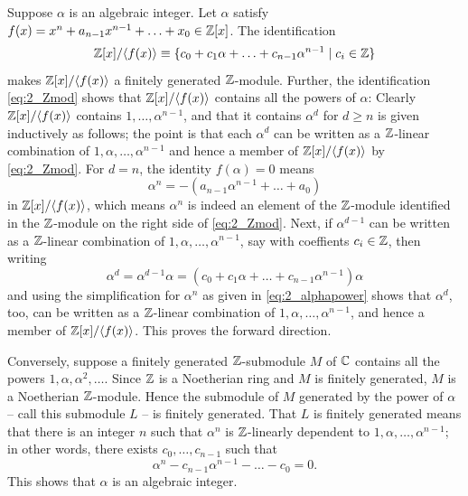 \documentclass[12pt]{article}
\begin{document}
Suppose $\alpha$ is an algebraic integer. 
Let $\alpha$ satisfy $f(x) = x^n + a_{n - 1}x^{n - 1} + \ldots + x_0 \in \mathbb{Z}[x]$. 
The identification 
\begin{equation} \label{eq:2_Zmod}
  \Z[x] / \<f(x)\> \equiv \{c_0 + c_1 \alpha + \ldots + c_{n - 1}\alpha^{n - 1} \mid c_{i} \in \Z\}
\end{equation}
makes $\mathbb{Z}[x] / \langle f(x)\rangle$ a finitely generated $\mathbb{Z}$-module. 
Further, the identification \eqref{eq:2_Zmod} shows that $\mathbb{Z}[x] / \langle f(x)\rangle$ contains all the powers of $\alpha$:
Clearly $\mathbb{Z}[x] / \langle f(x)\rangle$ contains $1, \ldots, \alpha^{n - 1}$, and that it contains $\alpha^d$ for $d \geq n$ is given inductively as follows;
the point is that each $\alpha^d$ can be written as a $\mathbb{Z}$-linear combination of $1, \alpha, \ldots, \alpha^{n - 1}$ and hence a member of $\mathbb{Z}[x] / \langle f(x)\rangle$ by \eqref{eq:2_Zmod}. 
For $d = n$, the identity $f(\alpha) = 0$ means 
\begin{equation} \label{eq:2_alphapower}
  \alpha^n = -(a_{n - 1}\alpha^{n - 1} + \ldots + a_0)
\end{equation}
in $\mathbb{Z}[x] / \langle f(x)\rangle$, which means $\alpha^n$ is indeed an element of the $\mathbb{Z}$-module identified in the $\mathbb{Z}$-module on the right side of \eqref{eq:2_Zmod}. 
Next, if $\alpha^{d - 1}$ can be written as a $\mathbb{Z}$-linear combination of $1, \alpha, \ldots, \alpha^{n - 1}$, say with coeffients $c_i \in \mathbb{Z}$, then writing 
$$\alpha^{d} = \alpha^{d - 1}\alpha = (c_0 + c_1 \alpha + \ldots + c_{n - 1}\alpha^{n - 1})\alpha$$
and using the simplification for $\alpha^n$ as given in \eqref{eq:2_alphapower} shows that $\alpha^d$, too, can be written as a $\mathbb{Z}$-linear combination of $1, \alpha, \ldots, \alpha^{n - 1}$, and hence a member of $\mathbb{Z}[x]/\langle f(x)\rangle$. 
This proves the forward direction. 

Conversely, suppose a finitely generated $\mathbb{Z}$-submodule $M$ of $\mathbb{C}$ contains all the powers $1, \alpha, \alpha^2, \ldots$.  
Since $\mathbb{Z}$ is a Noetherian ring and $M$ is finitely generated, $M$ is a Noetherian $\mathbb{Z}$-module. 
Hence the submodule of $M$ generated by the power of $\alpha$ -- call this submodule $L$ -- is finitely generated. 
That $L$ is finitely generated means that there is an integer $n$ such that $\alpha^{n}$ is $\mathbb{Z}$-linearly dependent to $1, \alpha, \ldots, \alpha^{n - 1}$; 
in other words, there exists $c_0, \ldots, c_{n - 1}$ such that 
$$\alpha^{n} - c_{n - 1} \alpha^{n - 1} - \ldots - c_0 = 0.$$
This shows that $\alpha$ is an algebraic integer. 
\end{document}
